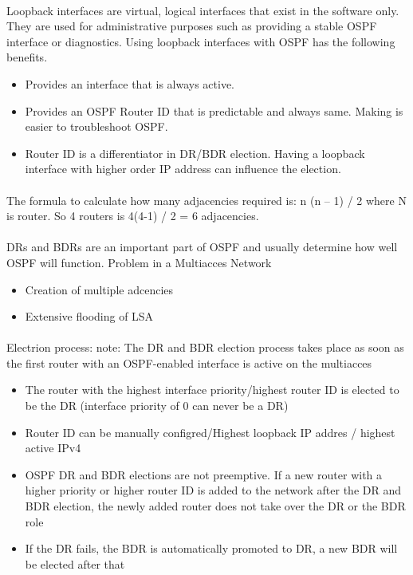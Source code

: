 \documentclass[10pt,landscape]{article}
\begin{document}
\begin{multicols}{3}
\paragraph{}
Loopback interfaces are virtual, logical interfaces that exist in the software only. They are used for administrative purposes such as providing a stable OSPF interface or diagnostics. Using loopback interfaces with OSPF has the following benefits.
\begin{itemize}
    \item Provides an interface that is always active.
    \item Provides an OSPF Router ID that is predictable and always same. Making is easier to troubleshoot OSPF.
    \item Router ID is a differentiator in DR/BDR election. Having a loopback interface with higher order IP address can influence the election.
\end{itemize}
\paragraph{}
The formula to calculate how many adjacencies required is: n (n – 1) / 2  where N is router. So 4 routers is 4(4-1) / 2 = 6 adjacencies. 
\paragraph{}
DRs and BDRs are an important part of OSPF and usually determine how well OSPF will function. Problem in a Multiacces Network 
\begin{itemize}
	\item Creation of multiple adcencies
	\item Extensive flooding of LSA
\end{itemize}
\paragraph{}
Electrion process:
note: The DR and BDR election process takes place as soon as the first router with an OSPF-enabled interface is active on the multiacces
\begin{itemize}
	\item The router with the highest interface priority/highest router ID is elected to be the DR (interface priority of 0 can never be a DR)
	\item Router ID can be manually configred/Highest loopback IP addres / highest active IPv4 
	\item OSPF DR and BDR elections are not preemptive. If a new router with a higher priority or higher router ID is added to the network after the DR and BDR election, the newly added router does not take over the DR or the BDR role
	\item If the DR fails, the BDR is automatically promoted to DR, a new BDR will be elected after that
\end{itemize}

\end{multicols}
\end{document}
